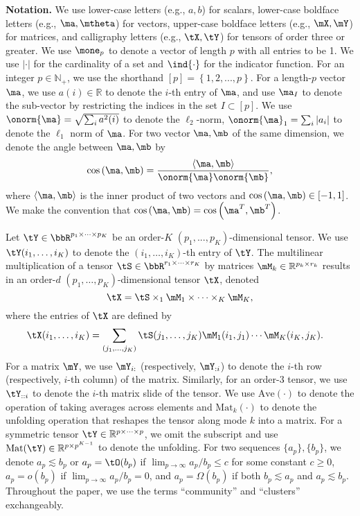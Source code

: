 \documentclass[lettersize,onecolumn,journal]{IEEEtran}
\theoremstyle{definition}
\theoremstyle{definition}
\newcommand{\of}[1]{\left(#1\right)}
\newcommand{\offf}[1]{\left\{#1\right\}}
\newcommand{\ang}[1]{\left\langle#1\right\rangle}
\begin{document}
{\bf Notation.} We use lower-case letters (e.g., $a,b$) for scalars, lower-case boldface letters (e.g., $\ma,\mtheta$) for vectors, upper-case boldface letters (e.g., $\mX,\mY$) for matrices, and calligraphy letters (e.g., $\tX,\tY$) for tensors of order three or greater. We use $\mone_p$ to denote a vector of length $p$ with all entries to be 1. We use $|\cdot|$ for the cardinality of a set and $\ind\{\cdot\}$ for the indicator function. For an integer $p\in\mathbb{N}_{+}$, we use the shorthand $[p]= \offf{1,2,...,p}$. For a length-$p$ vector $\ma$, we use $a(i)\in\mathbb{R}$ to denote the $i$-th entry of $\ma$, and use $\ma_{I}$ to denote the sub-vector by restricting the indices in the set $I\subset [p]$.  We use  $\onorm{\ma}=\sqrt{\sum_{i}a^2(i)}$ to denote the $\ell_2$-norm, $\onorm{\ma}_1=\sum_i |a_i|$ to denote the $\ell_1$ norm of $\ma$. For two vector $\ma, \mb$ of the same dimension, we denote the angle between $\ma, \mb$ by 
\begin{equation}
    \cos \of{\ma, \mb} = \frac{\ang{ \ma, \mb}}{ \onorm{\ma} \onorm{\mb} },
\end{equation}
where $\ang{\ma,\mb}$ is the inner product of two vectors and $\cos \of{\ma, \mb} \in [-1,1]$. We make the convention that $\cos \of{\ma, \mb} = \cos \of{\ma^T, \mb^T}$. 

Let $\tY  \in \bbR^{p_1 \times \cdots \times p_K}$ be an order-$K$ $(p_1,...,p_K)$-dimensional tensor. We use $\tY(i_1,\ldots,i_K)$ to denote the $(i_1,\ldots,i_K)$-th entry of $\tY$. The multilinear multiplication of a tensor $\tS\in \bbR^{r_1\times \cdots \times r_K}$ by matrices $\mM_k \in\mathbb{R}^{p_k\times r_k}$ results in an order-$d$ $(p_1,\ldots,p_K)$-dimensional tensor $\tX$, denoted
\[
\tX=\tS \times_1 \mM_1 \times \cdots \times_K \mM_K,
\]
where the entries of $\tX$ are defined by
\begin{align}
    &\tX(i_1,\ldots, i_K)=\sum_{(j_1,\ldots,j_K)}\tS(j_1,\ldots,j_K)\mM_1(i_1,j_1)\cdots \mM_K(i_K,j_K).
\end{align} 
For a matrix $\mY$, we use $\mY_{i:}$ (respectively, $\mY_{:i}$) to denote the $i$-th row (respectively, $i$-th column) of the matrix. Similarly, for an order-3 tensor, we use $\tY_{::i}$ to denote the $i$-th matrix slide of the tensor. We use $\text{Ave}(\cdot)$ to denote the operation of taking averages across elements and $\text{Mat}_k(\cdot)$ to denote the unfolding operation that reshapes the tensor along mode $k$ into a matrix. For a symmetric tensor $\tY\in\mathbb{R}^{p\times \cdots \times p}$, we omit the subscript and use $\text{Mat}(\tY)\in\mathbb{R}^{p\times p^{K-1}}$ to denote the unfolding. For two sequences $\{a_p\}, \{b_p\}$, we denote $a_p\lesssim b_p$ or $a_p=\tO(b_p)$ if $\lim_{p\to\infty}a_p /b_p\leq c$ for some constant $c\geq 0$, $a_p=o(b_p)$ if $\lim_{p\to\infty}a_p/b_p =0$, and $a_p = \Omega(b_p)$ if both $b_p \lesssim a_p$ and $a_p\lesssim b_p$. Throughout the paper, we use the terms ``community'' and ``clusters'' exchangeably. 
\end{document}
